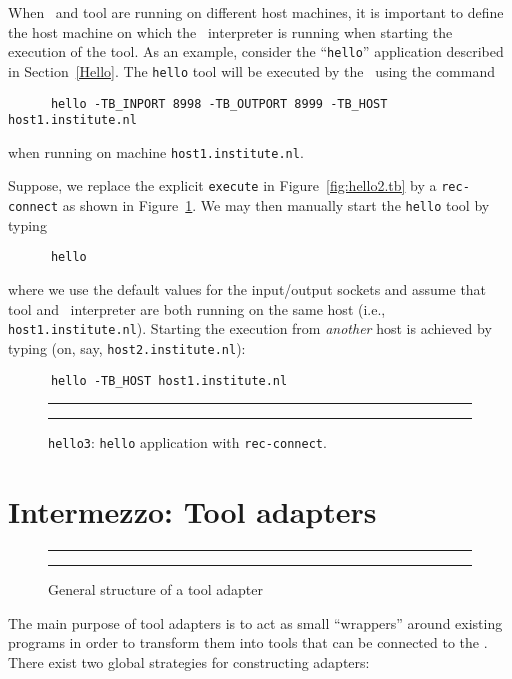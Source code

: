 \noindent When \TB\ and tool are running on different host machines,
it is important
to define the host machine on which the \TB\ interpreter is running
when starting the execution of the tool.
As an example, consider the ``{\tt hello}'' application described in Section~\ref{Hello}.
The {\tt hello} tool will be executed by the \TB\ using
the command
\begin{verbatim}
      hello -TB_INPORT 8998 -TB_OUTPORT 8999 -TB_HOST host1.institute.nl
\end{verbatim}
when running on machine {\tt host1.institute.nl}.

Suppose, we replace the explicit {\tt execute} in Figure~\ref{fig:hello2.tb}
by a {\tt rec-connect} as shown in Figure~\ref{fig:hello3.tb}.
We may then manually start the
{\tt hello} tool by typing
\begin{verbatim}
      hello
\end{verbatim}
where we use the default values for the input/output sockets and assume
that tool and \TB\ interpreter are both running on the same host (i.e., {\tt host1.institute.nl}).
Starting the execution from {\em another} host is achieved by typing
(on, say, {\tt host2.institute.nl}):
\begin{verbatim}
      hello -TB_HOST host1.institute.nl
\end{verbatim}

\begin{figure}[tb]
\rule{\textwidth}{0.5mm}

  \caption{{\tt hello3}: {\tt hello} application with {\tt rec-connect}.}
  \label{fig:hello3.tb}
\rule{\textwidth}{0.5mm}
\end{figure}

\section{Intermezzo: Tool adapters}
\begin{figure}[t]
\rule{\textwidth}{0.5mm}
  
  \centerline{\box\graph}
  \caption{General structure of a tool adapter}
  \label{fig:adapter}
\rule{\textwidth}{0.5mm}
\end{figure}

The main purpose of tool adapters is to act as small ``wrappers'' around
existing programs in order to transform them into tools that
can be connected to the \TB. There exist two global strategies
for constructing adapters:

